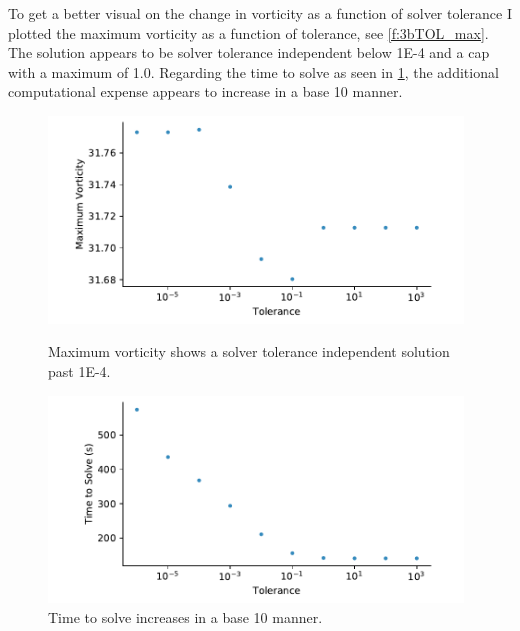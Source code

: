 \documentclass[10pt,english]{article}
\begin{document}
To get a better visual on the change in vorticity as a function of solver tolerance I plotted the maximum vorticity as a function of tolerance, see \cref{f:3bTOL_max}.  The solution appears to be solver tolerance independent below 1E-4 and a cap with a maximum of 1.0.  Regarding the time to solve as seen in \cref{f:3bTOL_time_cells}, the additional computational expense appears to increase in a base 10 manner.\vspace{40pt}
\begin{figure}[h!]
\centering
\begin{minipage}{.49\textwidth}
  \centering
\includegraphics[trim={1.0cm 0cm 1.4cm 0cm},clip,width=0.98\textwidth]{fig3b_TOL_max}
\vspace{3pt}
\caption{Maximum vorticity shows a solver tolerance independent solution past 1E-4.}
\label{f:3bTOL_max}
\end{minipage}%
\hspace{5pt}
\begin{minipage}{.49\textwidth}
  \centering
\includegraphics[trim={1.0cm 0cm 1.4cm .5cm},clip,width=0.98\textwidth]{fig3b_TOL_time_cells}
\caption{Time to solve increases in a base 10 manner.}
\label{f:3bTOL_time_cells}
\end{minipage}
\end{figure}
\end{document}
